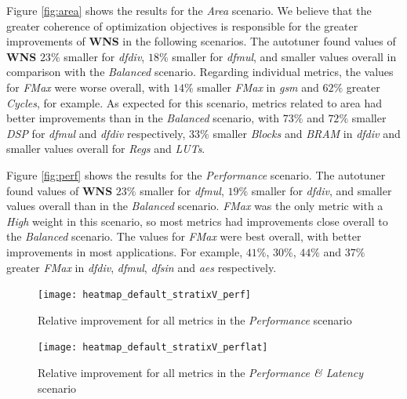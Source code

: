 Figure \ref{fig:area} shows the results for the \textit{Area} scenario.  We
believe that the greater coherence of optimization objectives is responsible
for the greater improvements of \textbf{WNS} in the following scenarios. The
autotuner found values of \textbf{WNS} $23\%$ smaller for \textit{dfdiv},
$18\%$ smaller for \textit{dfmul}, and smaller values overall in comparison
with the \textit{Balanced} scenario. Regarding individual metrics, the values
for \textit{FMax} were worse overall, with $14\%$ smaller \textit{FMax} in
\textit{gsm} and $62\%$ greater \textit{Cycles}, for example. As expected for
this scenario, metrics related to area had better improvements than in the
\textit{Balanced} scenario, with $73\%$ and $72\%$ smaller \textit{DSP} for
\textit{dfmul} and \textit{dfdiv} respectively, $33\%$ smaller \textit{Blocks}
and \textit{BRAM} in \textit{dfdiv} and smaller values overall for
\textit{Regs} and \textit{LUTs}.

Figure \ref{fig:perf} shows the results for the \textit{Performance} scenario.
The autotuner found values of \textbf{WNS} $23\%$ smaller for \textit{dfmul},
$19\%$ smaller for \textit{dfdiv}, and smaller values overall than in the
\textit{Balanced} scenario.  \textit{FMax} was the only metric with a
\textit{High} weight in this scenario, so most metrics had improvements close
overall to the \textit{Balanced} scenario.  The values for \textit{FMax} were
best overall, with better improvements in most applications. For example,
$41\%$, $30\%$, $44\%$ and $37\%$ greater \textit{FMax} in \textit{dfdiv},
\textit{dfmul}, \textit{dfsin} and \textit{aes} respectively.

\begin{figure}[htpb]
    \centering
    \begin{minipage}{.48\textwidth}
        \centering
        \texttt{[image: heatmap\_default\_stratixV\_perf]}
        \caption{Relative improvement for all metrics in the
        \textit{Performance} scenario}
        \label{fig:perf}
    \end{minipage}%
    \hfill
    \begin{minipage}{.48\textwidth}
        \centering
        \texttt{[image: heatmap\_default\_stratixV\_perflat]}
        \caption{Relative improvement for all metrics in the
        \textit{Performance \& Latency} scenario}
        \label{fig:perflat}
    \end{minipage}
\end{figure}

